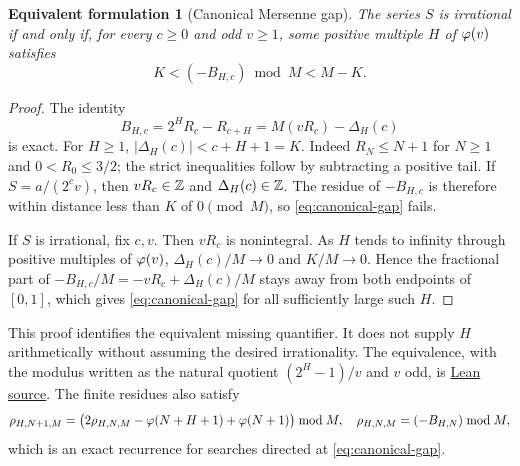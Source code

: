 \documentclass[11pt]{article}
\newtheorem{equivform}[theorem]{Equivalent formulation}
\begin{document}
\begin{equivform}[Canonical Mersenne gap]\label{res:canonicalmersenne}
The series $S$ is irrational if and only if, for every $c\ge0$ and odd
$v\ge1$, some positive multiple $H$ of $\varphi(v)$ satisfies
\begin{equation}\label{eq:canonical-gap}
 K<(-B_{H,c})\bmod M<M-K.
\end{equation}
\end{equivform}
\begin{proof}
The identity
\[
 B_{H,c}=2^HR_c-R_{c+H}=M(vR_c)-\Delta_H(c)
\]
is exact. For $H\ge1$, $|\Delta_H(c)|<c+H+1=K$. Indeed $R_N\le N+1$
for $N\ge1$ and $0<R_0\le3/2$; the strict inequalities follow by subtracting
a positive tail. If $S=a/(2^cv)$, then $vR_c\in\mathbb{Z}$ and
$\Delta_H(c)\in\mathbb{Z}$. The residue of $-B_{H,c}$ is therefore within distance
less than $K$ of $0\pmod M$, so \eqref{eq:canonical-gap} fails.

If $S$ is irrational, fix $c,v$. Then $vR_c$ is nonintegral. As $H$ tends
to infinity through positive multiples of $\varphi(v)$,
$\Delta_H(c)/M\to0$ and $K/M\to0$. Hence the fractional part of
$-B_{H,c}/M=-vR_c+\Delta_H(c)/M$ stays away from both endpoints of $[0,1]$,
which gives \eqref{eq:canonical-gap} for all sufficiently large such $H$.
\end{proof}
This proof identifies the equivalent missing quantifier. It does not supply
$H$ arithmetically without assuming the desired irrationality. The
equivalence, with the modulus written as the natural quotient $(2^H-1)/v$
and $v$ odd, is
\href{https://github.com/wcook04/plectis-erdos/blob/f36a98bf3d3e6f65f1074e3b800e3293d5b8a51a/ErdosProblems/Erdos249/PaperCompleteR7/ArithmeticAssemblies.lean#L156}{Lean source}.
The finite residues also satisfy
\[
 \rho_{H,N+1,M}=
 \bigl(2\rho_{H,N,M}-\varphi(N+H+1)+\varphi(N+1)\bigr)\bmod M,
 \quad \rho_{H,N,M}=(-B_{H,N})\bmod M,
\]
which is an exact recurrence for searches directed at \eqref{eq:canonical-gap}.
\end{document}
